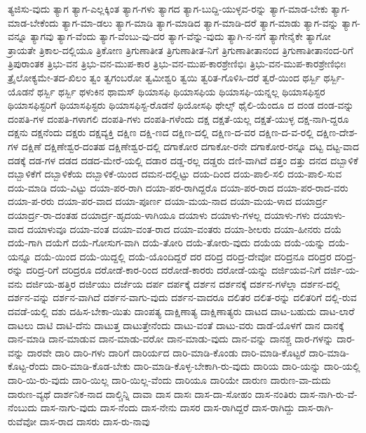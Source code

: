 {ತ್ಯಜಿಸು-ವುದು
ತ್ಯಾಗ
ತ್ಯಾಗ-ಎಲ್ಲಕ್ಕಿಂತ
ತ್ಯಾಗ-ಗಳು
ತ್ಯಾಗದ
ತ್ಯಾಗ-ಬುದ್ದಿ-ಯುಳ್ಳವ-ರನ್ನು
ತ್ಯಾಗ-ಮಾಡ-ಬೇಕು
ತ್ಯಾಗ-ಮಾಡ-ಬೇಕೆಂದು
ತ್ಯಾಗ-ಮಾ-ಡಲು
ತ್ಯಾಗ-ಮಾಡಿ
ತ್ಯಾಗ-ಮಾಡಿದ
ತ್ಯಾಗ-ಮಾಡಿ-ದರೆ
ತ್ಯಾಗ-ಮಾಡು
ತ್ಯಾಗ-ವನ್ನು
ತ್ಯಾಗ-ವನ್ನೂ
ತ್ಯಾಗವು
ತ್ಯಾಗ-ವೆಂದು
ತ್ಯಾಗ-ವೆಂಬು-ವು-ದರ
ತ್ಯಾಗ-ವೆನ್ನು-ವುದು
ತ್ಯಾಗಿ-ನ-ನಗೆ
ತ್ಯಾಗೇನೈಕೇ
ತ್ಯಾಗೋ
ತ್ರಾಯತೇ
ತ್ರಿಕಾಲ-ದಲ್ಲಿಯೂ
ತ್ರಿಕೋಣ
ತ್ರಿಗುಣಾತೀತ
ತ್ರಿಗುಣಾತೀತ-ನಿಗೆ
ತ್ರಿಗುಣಾತೀತಾನಂದ
ತ್ರಿಗುಣಾತೀತಾನಂದ-ರಿಗೆ
ತ್ರಿಪುರಾಂತಕ
ತ್ರಿಭು-ವನ
ತ್ರಿಭು-ವನ-ಮುಪ-ಕಾರ
ತ್ರಿಭು-ವನ-ಮುಪ-ಕಾರಶ್ರೇಣಿಭಿಃ
ತ್ರಿಭು-ವನ-ಮುಪ-ಕಾರಶ್ರೇಣಿಭೀಃ
ತ್ರೈಲೋಕ್ಯಮೇ-ತದ-ಖಿಲಂ
ತ್ವಂ
ತ್ವಗಂಬರೋ
ತ್ವಮೀಶ್ವರಿ
ತ್ವಯಿ
ತ್ವರಿತ-ಗೊಳಿಸಿ-ದರೆ
ತ್ವರೆ-ಯಿಂದ
ಥರ್ಸ್ಬಿ
ಥರ್ಸ್ಬಿ-ಯೊಡನೆ
ಥರ್ಸ್ಬಿ
ಥರ್ಸ್ಬಿ
ಥಳುಕಿನ
ಥಾಮಸ್
ಥಿಯಾಸಫಿ
ಥಿಯಾಸಫಿಯ
ಥಿಯಾಸಫಿ-ಯನ್ನಲ್ಲ
ಥಿಯಾಸಫಿಸ್ಟರ
ಥಿಯಾಸಫಿಸ್ಟರಿಗೆ
ಥಿಯಾಸಫಿಸ್ಟರು
ಥಿಯಾಸಫಿಸ್ಟ-ರೊಡನೆ
ಥಿಯೋಸಫಿ
ಥೇಲ್ಸ್
ಥೈಲಿ-ಯೆಂದೂ
ದ
ದಂಡ
ದಂಡ-ವನ್ನು
ದಂಪತಿ-ಗಳ
ದಂಪತಿ-ಗಳಾಗಲಿ
ದಂಪತಿ-ಗಳು
ದಂಪತಿ-ಗಳೆಂದು
ದಕ್ಷ
ದಕ್ಷತೆ-ಯಲ್ಲ
ದಕ್ಷತೆ-ಯುಳ್ಳ
ದಕ್ಷ-ನಾಗಿ-ದ್ದರೂ
ದಕ್ಷನು
ದಕ್ಷನೆಂದು
ದಕ್ಷರು
ದಕ್ಷವ್ಯಕ್ತಿ
ದಕ್ಷಿಣ
ದಕ್ಷಿ-ಣದ
ದಕ್ಷಿಣ-ದಲ್ಲಿ
ದಕ್ಷಿಣ-ದ-ವರ
ದಕ್ಷಿಣ-ದ-ವ-ರಲ್ಲಿ
ದಕ್ಷಿಣ-ದೇಶ-ಗಳ
ದಕ್ಷಿಣೆ
ದಕ್ಷಿಣೇಶ್ವರ-ದಂತಹ
ದಕ್ಷಿಣೇಶ್ವರ-ದಲ್ಲಿ
ದಗಾಕೋರ
ದಗಾಕೋ-ರನೇ
ದಗಾಕೋರ-ರನ್ನೂ
ದಟ್ಟ
ದಟ್ಟ-ವಾದ
ದಡಕ್ಕೆ
ದಡ-ಗಳ
ದಡದ
ದಡದ-ಮೇರೆ-ಯಲ್ಲಿ
ದಡಾರ
ದಡ್ಡ-ರಲ್ಲ
ದಡ್ಡರು
ದಣಿ-ವಾಗಿದೆ
ದತ್ತಂ
ದತ್ತು
ದನದ
ದಬ್ಬಾಳಿಕೆ
ದಬ್ಬಾಳಿಕೆಗೆ
ದಬ್ಬಾಳಿಕೆಯ
ದಬ್ಬಾಳಿಕೆ-ಯಿಂದ
ದಮನ-ದಲ್ಲಿಟ್ಟು
ದಯ-ದಿಂದ
ದಯ-ಪಾಲಿ-ಸಲಿ
ದಯ-ಪಾಲಿ-ಸುವ
ದಯ-ಮಾಡಿ
ದಯ-ವಿಟ್ಟು
ದಯಾ-ಪರ-ರಾಗಿ
ದಯಾ-ಪರ-ರಾಗಿದ್ದರೊ
ದಯಾ-ಪರ-ರಾದ
ದಯಾ-ಪರ-ರಾದ-ವರು
ದಯಾ-ಪ-ರರು
ದಯಾ-ಪರ-ವಾದ
ದಯಾ-ಪೂರ್ಣ
ದಯಾ-ಮಯ-ನಾದ
ದಯಾ-ಮಯ-ಳಾದ
ದಯಾರ್ದ್ರ
ದಯಾರ್ದ್ರ-ರಾ-ದಂತಹ
ದಯಾರ್ದ್ರ-ಹೃದಯ-ಳಾಗಿಯೂ
ದಯಾಳು
ದಯಾಳು-ಗಳಲ್ಲ
ದಯಾಳು-ಗಳು
ದಯಾಳು-ವಾದ
ದಯಾಳುವೂ
ದಯಾ-ವಂತ
ದಯಾ-ವಂತ-ರಾದ
ದಯಾ-ವಂತರು
ದಯಾ-ಶೀಲರು
ದಯಾ-ಹೀನರು
ದಯೆ
ದಯೆ-ಗಾಗಿ
ದಯೆಗೆ
ದಯೆ-ಗೋಸುಗ-ವಾಗಿ
ದಯೆ-ತೋರಿ
ದಯೆ-ತೋರು-ವುದು
ದಯೆಯ
ದಯೆ-ಯನ್ನು
ದಯೆ-ಯನ್ನೂ
ದಯೆ-ಯಿಂದ
ದಯೆ-ಯಿದ್ದಲ್ಲಿ
ದಯೆ-ಯೊಂದಿದ್ದರೆ
ದರ
ದರಿದ್ರ
ದರಿದ್ರ-ದೇವೋ
ದರಿದ್ರನೂ
ದರಿದ್ರರ
ದರಿದ್ರ-ರನ್ನು
ದರಿದ್ರ-ರಿಗೆ
ದರಿದ್ರರೂ
ದರೋಡೆ-ಕಾರ-ರಿಂದ
ದರೋಡೆ-ಕಾರರು
ದರೋಡೆ-ಯನ್ನು
ದರ್ಜಿಯವ-ನಿಗೆ
ದರ್ಜಿ-ಯ-ವನು
ದರ್ಜಿಯ-ಹತ್ತಿರ
ದರ್ಜಿಯು
ದರ್ಜೆಯ
ದರ್ಪ
ದರ್ಪಕ್ಕೆ
ದರ್ಶನ
ದರ್ಶನಕ್ಕೆ
ದರ್ಶನ-ಗಳೆಲ್ಲಾ
ದರ್ಶನ-ದಲ್ಲಿ
ದರ್ಶನ-ವನ್ನು
ದರ್ಶನ-ವಾಗಿದೆ
ದರ್ಶನ-ವಾಗು-ವುದು
ದರ್ಶನ-ವಾದರೂ
ದಲಿತರ
ದಲಿತ-ರನ್ನು
ದಲಿತರಿಗೆ
ದಲ್ಲಿ-ರುವ
ದವಡೆ-ಯಲ್ಲಿ
ದಶು
ದಹಿಸ-ಬೇಕಾ-ಯಿತು
ದಾಂಪತ್ಯ
ದಾಕ್ಷಿಣಾತ್ಯ
ದಾಕ್ಷಿಣಾತ್ಯರು
ದಾಟದ
ದಾಟ-ಬಹುದು
ದಾಟ-ಲಾರೆ
ದಾಟಲು
ದಾಟಿ
ದಾಟಿ-ದೆನು
ದಾಟುತ್ತ
ದಾಟುತ್ತೇನೆಂದು
ದಾಟು-ವಂತೆ
ದಾಟು-ವರು
ದಾಡೆ-ಯೊಳಗೆ
ದಾನ
ದಾನಕ್ಕೆ
ದಾನ-ಮಾಡಿ
ದಾನ-ಮಾಡುವ
ದಾನ-ಮಾಡು-ವರೋ
ದಾನ-ಮಾಡು-ವುದು
ದಾನ-ವನ್ನು
ದಾನಶ್ಚ
ದಾರ-ಗಳನ್ನು
ದಾರ-ವನ್ನು
ದಾರವೇ
ದಾರಿ
ದಾರಿ-ಗಳು
ದಾರಿಗೆ
ದಾರಿರ್ಯದ
ದಾರಿ-ಮಾಡಿ-ಕೊಂಡು
ದಾರಿ-ಮಾಡಿ-ಕೊಟ್ಟರೆ
ದಾರಿ-ಮಾಡಿ-ಕೊಟ್ಟ-ರೆಂದು
ದಾರಿ-ಮಾಡಿ-ಕೊಡ-ಬೇಕು
ದಾರಿ-ಮಾಡಿ-ಕೊಳ್ಳ-ಬೇಕಾಗಿ-ರು-ವುದು
ದಾರಿಯ
ದಾರಿ-ಯನ್ನು
ದಾರಿ-ಯಲ್ಲಿ
ದಾರಿ-ಯಿ-ರು-ವುದು
ದಾರಿ-ಯಿಲ್ಲ
ದಾರಿ-ಯಿಲ್ಲ-ವೆಂದು
ದಾರಿಯೂ
ದಾರಿಯೇ
ದಾರುಣ
ದಾರುಣ-ವಾ-ದುದು
ದಾರುಣ-ವ್ಯಥೆ
ದಾರ್ಶನಿಕ-ನಾದ
ದಾಲ್ಚಿನ್ನಿ
ದಾವಾ
ದಾಸ
ದಾಸಃ
ದಾಸ-ದಾ-ಸೋಹಂ
ದಾಸ-ನಂತಿರು
ದಾಸ-ನಾಗಿ-ರು-ವೆ-ನೆಂಬುದು
ದಾಸ-ನಾಗು-ವುದು
ದಾಸ-ನೆಂದು
ದಾಸ-ನೇನು
ದಾಸರ
ದಾಸ-ರಾಗಿದ್ದರೆ
ದಾಸ-ರಾಗಿದ್ದು
ದಾಸ-ರಾಗಿ-ರುವೆವೋ
ದಾಸ-ರಾದ
ದಾಸರು
ದಾಸ-ರು-ನಾವು
}
